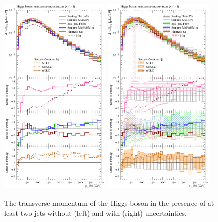 \begin{figure}[t!]
  \centering
  \includegraphics[width=0.47\textwidth]{figures/hjetscomp_u_H_jj_pT_incl.pdf}
  \hfill
  \includegraphics[width=0.47\textwidth]{figures/hjetscomp_H_jj_pT_incl.pdf}
  \caption{
    The transverse momentum of the Higgs boson in the presence
    of at least two jets without (left) and with (right) uncertainties.
    \label{fig:hjetscomp:results:2obs:hpt_j2pt}
  }
\end{figure}

